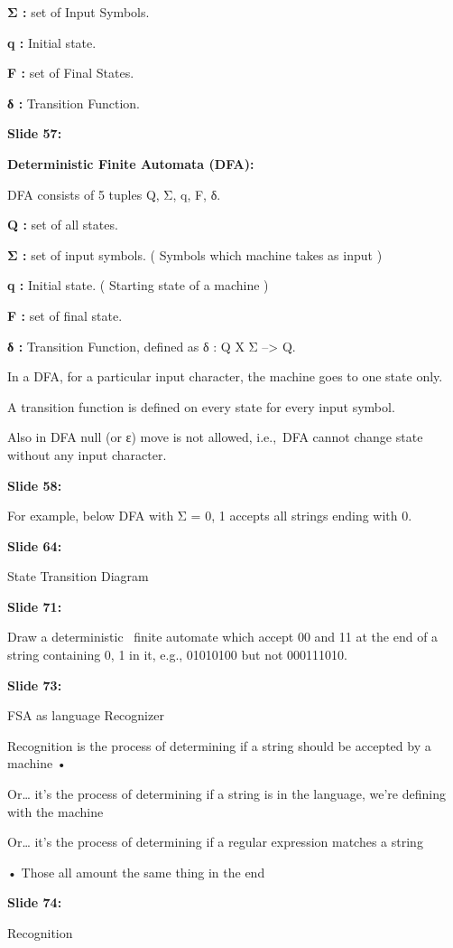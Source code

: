 \documentclass[11pt,a4paper]{article}
\begin{document}
\textbf{Σ :}  set of Input Symbols.

\textbf{q :}  Initial state.

\textbf{F :}  set of Final States.

\textbf{δ :}  Transition Function.

\textbf{Slide 57:}

\textbf{Deterministic Finite Automata (DFA):} 

DFA consists of 5 tuples {Q, Σ, q, F, δ}.

\textbf{Q :}  set of all states.

\textbf{Σ :}  set of input symbols. ( Symbols which machine takes as input )

\textbf{q :}  Initial state. ( Starting state of a machine )

\textbf{F :}  set of final state.

\textbf{δ :}  Transition Function, defined as δ : Q X Σ --> Q.

In a DFA, for a particular input character, the machine goes to one state only.

A transition function is defined on every state for every input symbol.

Also in DFA null (or ε) move is not allowed, i.e., DFA cannot change state without any input character.

\textbf{Slide 58:}

For example, below DFA with Σ = {0, 1} accepts all strings ending with 0.

\textbf{Slide 64:}

State Transition Diagram

\textbf{Slide 71:}

Draw a deterministic  finite automate which accept 00 and 11 at the end of a string containing 0, 1 in it, e.g., 01010100 but not 000111010.

\textbf{Slide 73:}

FSA as language Recognizer

Recognition is the process of determining if a string should be accepted by a machine •

Or… it’s the process of determining if a string is in the language, we’re defining with the machine

Or… it’s the process of determining if a regular expression matches a string

• Those all amount the same thing in the end

\textbf{Slide 74:}

Recognition
\end{document}
